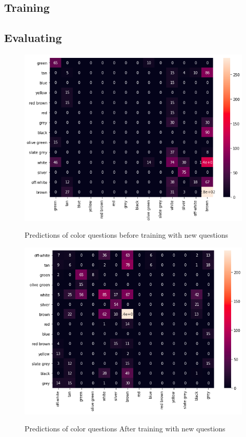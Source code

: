 

\subsection{Training}




\subsection{Evaluating}

\begin{figure}[H]
\includegraphics[scale=0.45]{latex/images/Heatmapbefore.png}
\label{fig:Heatmapbefore}
\caption{Predictions of color questions before training with new questions}
\end{figure}

\begin{figure}[H]
\includegraphics[scale=0.45]{latex/images/HeatmapAfter.png}
\label{fig:HeatmapAfter}
\caption{Predictions of color questions After training with new questions}
\end{figure}

